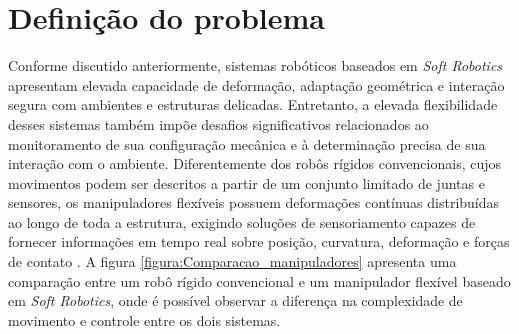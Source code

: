 














\section{Defini\c{c}\~ao do problema}
\label{section:definicaoproblema}


Conforme discutido anteriormente, sistemas robóticos baseados em \textit{Soft Robotics} apresentam elevada capacidade de deformação, adaptação geométrica 
e interação segura com ambientes e estruturas delicadas. Entretanto, a elevada flexibilidade desses sistemas também impõe desafios significativos 
relacionados ao monitoramento de sua configuração mecânica e à determinação precisa de sua interação com o ambiente. Diferentemente dos robôs rígidos 
convencionais, cujos movimentos podem ser descritos a partir de um conjunto limitado de juntas e sensores, os manipuladores flexíveis possuem deformações 
contínuas distribuídas ao longo de toda a estrutura, exigindo soluções de sensoriamento capazes de fornecer informações em tempo real sobre posição, 
curvatura, deformação e forças de contato \cite{Lin2021} \cite{Zhou2024}. A figura \ref{figura:Comparacao_manipuladores} apresenta uma comparação entre 
um robô rígido convencional e um manipulador flexível baseado em \textit{Soft Robotics}, onde é possível observar a diferença na complexidade de movimento 
e controle entre os dois sistemas.

